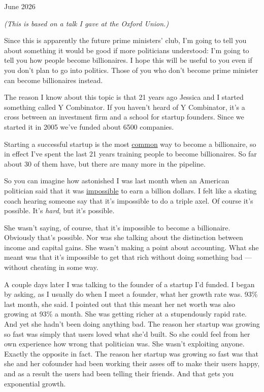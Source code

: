\documentclass[12pt]{book}
\begin{document}
June 2026

\emph{(This is based on a talk I gave at the Oxford Union.)}

Since this is apparently the future prime ministers' club, I'm going to
tell you about something it would be good if more politicians
understood: I'm going to tell you how people become billionaires. I hope
this will be useful to you even if you don't plan to go into politics.
Those of you who don't become prime minister can become billionaires
instead.

The reason I know about this topic is that 21 years ago Jessica and I
started something called Y Combinator. If you haven't heard of Y
Combinator, it's a cross between an investment firm and a school for
startup founders. Since we started it in 2005 we've funded about 6500
companies.

Starting a successful startup is the most \href{richnow.html}{common}
way to become a billionaire, so in effect I've spent the last 21 years
training people to become billionaires. So far about 30 of them have,
but there are many more in the pipeline.

So you can imagine how astonished I was last month when an American
politician said that it was
\href{https://x.com/MarcoFoster_/status/2052427151371047016}{impossible}
to earn a billion dollars. I felt like a skating coach hearing someone
say that it's impossible to do a triple axel. Of course it's possible.
It's \emph{hard}, but it's possible.

She wasn't saying, of course, that it's impossible to become a
billionaire. Obviously that's possible. Nor was she talking about the
distinction between income and capital gains. She wasn't making a point
about accounting. What she meant was that it's impossible to get that
rich without doing something bad --- without cheating in some way.

A couple days later I was talking to the founder of a startup I'd
funded. I began by asking, as I usually do when I meet a founder, what
her growth rate was. 93\% last month, she said. I pointed out that this
meant her net worth was also growing at 93\% a month. She was getting
richer at a stupendously rapid rate. And yet she hadn't been doing
anything bad. The reason her startup was growing so fast was simply that
users loved what she'd built. So she could feel from her own experience
how wrong that politician was. She wasn't exploiting anyone. Exactly the
opposite in fact. The reason her startup was growing so fast was that
she and her cofounder had been working their asses off to make their
users happy, and as a result the users had been telling their friends.
And that gets you exponential growth.
\end{document}
